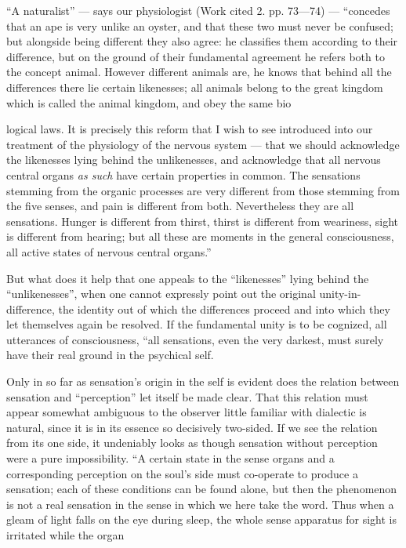 \documentclass[12pt,a4paper]{book}
\begin{document}
``A naturalist'' --- says our physiologist (Work cited 2. pp. 73---74) --- ``concedes
that an ape is very unlike an oyster, and that these two must never be confused; but
alongside being different they also agree: he classifies them according to their
difference, but on the ground of their fundamental agreement he refers both to the
concept animal. However different animals are, he knows that behind all the
differences there lie certain likenesses; all animals belong to the great kingdom
which is called the animal kingdom, and obey the same bio%

logical laws. It is precisely this reform that I wish to see introduced into our
treatment of the physiology of the nervous system --- that we should acknowledge the
likenesses lying behind the unlikenesses, and acknowledge that all nervous central
organs \emph{as such} have certain properties in common. The sensations stemming from
the organic processes are very different from those stemming from the five senses,
and pain is different from both. Nevertheless they are all sensations. Hunger is
different from thirst, thirst is different from weariness, sight is different from
hearing; but all these are moments in the general consciousness, all active states of
nervous central organs.''

But what does it help that one appeals to the ``likenesses'' lying behind the
``unlikenesses'', when one cannot expressly point out the original
unity-in-difference, the identity out of which the differences proceed and into which
they let themselves again be resolved. If the fundamental unity is to be cognized,
all utterances of consciousness, ``all sensations, even the very darkest, must surely
have their real ground in the psychical self.

Only in so far as sensation's origin in the self is evident does the relation
between sensation and ``perception'' let itself be made clear. That this relation
must appear somewhat ambiguous to the observer little familiar with dialectic is
natural, since it is in its essence so decisively two-sided. If we see the relation
from its one side, it undeniably looks as though sensation without perception were a
pure impossibility. ``A certain state in the sense organs and a corresponding
perception on the soul's side must co-operate to produce a sensation; each of these
conditions can be found alone, but then the phenomenon is not a real sensation in the
sense in which we here take the word. Thus when a gleam of light falls on the eye
during sleep, the whole sense apparatus for sight is irritated while the organ
\end{document}
